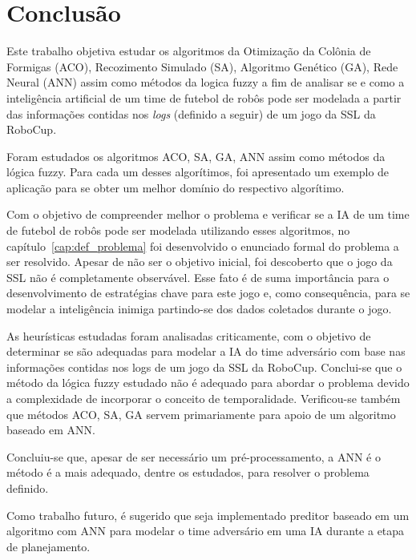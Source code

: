 \chapter{Conclusão}\label{cap:conclusao}

Este trabalho objetiva estudar os algoritmos da Otimização da Colônia de
Formigas (ACO), Recozimento Simulado (SA), Algoritmo Genético (GA), Rede Neural
(ANN) assim como métodos da logica fuzzy a fim de analisar se e como a
inteligência artificial de um time de futebol de robôs pode ser modelada a
partir das informações contidas nos \textit{logs} (definido a seguir) de um jogo da SSL
da RoboCup.

Foram estudados os algoritmos ACO, SA, GA,
ANN assim como métodos da lógica fuzzy. Para cada um desses algorítimos, foi
apresentado
um exemplo de aplicação para se obter um melhor domínio do respectivo
algorítimo.

Com o objetivo de compreender melhor o problema e verificar se a IA de um time
de
futebol de robôs pode ser modelada utilizando esses algoritmos, no
capítulo~\ref{cap:def_problema} foi desenvolvido o enunciado formal do problema
a ser resolvido.
Apesar de não ser o objetivo inicial, foi descoberto que o jogo da SSL não é
completamente observável. Esse fato é de suma importância para o desenvolvimento
de estratégias chave para este jogo e, como consequência, para se modelar a
inteligência inimiga partindo-se dos dados coletados durante o jogo.

As heurísticas estudadas foram analisadas
criticamente, com o objetivo de determinar se são adequadas para modelar a IA
do time adversário com base nas informações contidas nos logs de um jogo da SSL
da RoboCup. Conclui-se que o método da lógica fuzzy estudado não é adequado para
abordar o problema devido a complexidade de incorporar o conceito de
temporalidade.
Verificou-se também que métodos ACO, SA, GA servem primariamente para apoio de
um algoritmo baseado em ANN\@.

Concluiu-se que, apesar de ser necessário um pré-processamento, a ANN é o
método é a mais adequado, dentre os estudados, para resolver o problema definido.

Como trabalho futuro, é sugerido que seja implementado preditor baseado em
um algoritmo com ANN para modelar o time adversário em uma IA durante a etapa de
planejamento.



